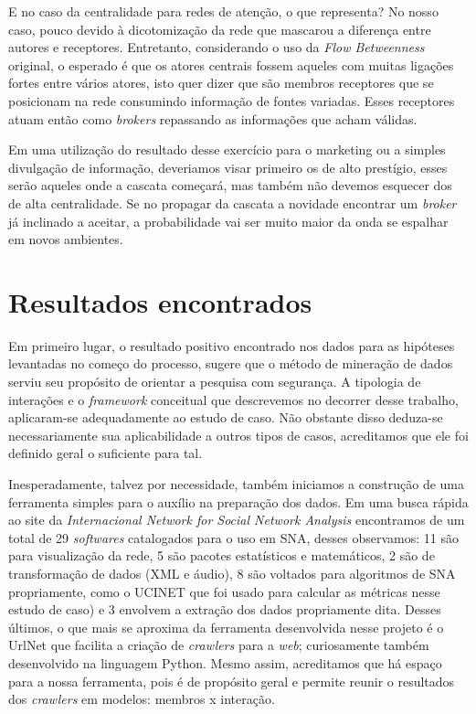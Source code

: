 E no caso da centralidade para redes de atenção, o que representa? No nosso
caso, pouco devido à dicotomização da rede que mascarou a diferença entre
autores e receptores. Entretanto, considerando o uso da \emph{Flow Betweenness}
original, o esperado é que os atores centrais fossem aqueles com muitas ligações
fortes entre vários atores, isto quer dizer que são membros receptores que se
posicionam na rede consumindo informação de fontes variadas. Esses receptores
atuam então como \emph{brokers} repassando as informações que acham válidas. 

Em uma utilização do resultado desse exercício para o marketing ou a simples
divulgação de informação, deveriamos visar primeiro os de alto prestígio, esses
serão aqueles onde a cascata começará, mas também não devemos esquecer dos de
alta centralidade. Se no propagar da cascata a novidade encontrar um
\emph{broker} já inclinado a aceitar, a probabilidade vai ser muito maior da
onda se espalhar em novos ambientes.

\section{Resultados encontrados}
\label{ap:sec:resultados}

Em primeiro lugar, o resultado positivo encontrado nos dados para as hipóteses
levantadas no começo do processo, sugere que o método de mineração de dados
serviu seu propósito de orientar a pesquisa com segurança. A tipologia de
interações e o \emph{framework} conceitual que descrevemos no decorrer desse
trabalho, aplicaram-se adequadamente ao estudo de caso. Não obstante disso
deduza-se necessariamente sua aplicabilidade a outros tipos de casos,
acreditamos que ele foi definido geral o suficiente para tal.

Inesperadamente, talvez por necessidade, também iniciamos a construção de uma
ferramenta simples para o auxílio na preparação dos dados. Em uma busca rápida ao
site da \emph{Internacional Network for Social Network Analysis}
\citep{INSNA2010} encontramos de um total de 29 \emph{softwares} catalogados para
o uso em SNA, desses observamos: 11 são para visualização da rede, 5 são pacotes
estatísticos e matemáticos, 2 são de transformação de dados (XML e áudio), 8 são
voltados para algoritmos de SNA propriamente, como o UCINET \citep{Borgatti2010}
que foi usado para calcular as métricas nesse estudo de caso) e 3 envolvem a
extração dos dados propriamente dita. Desses últimos, o que mais se aproxima da
ferramenta desenvolvida nesse projeto é o UrlNet \citep{Hunscher2010} que
facilita a criação de \emph{crawlers} para a \emph{web}; curiosamente também
desenvolvido na linguagem Python. Mesmo assim, acreditamos que há espaço para a
nossa ferramenta, pois é de propósito geral e permite reunir o resultados dos
\emph{crawlers} em modelos: membros x interação.

 

